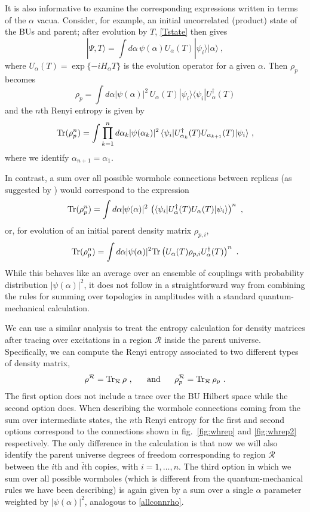\documentclass[12pt]{article}
\numberwithin{equation}{section}
\newcommand{\beq}{\begin{equation}}
\newcommand{\eeq}{\end{equation}}
\newcommand{\Tr}{{\rm Tr}}
\begin{document}
It is also informative to examine the corresponding expressions written in terms of the $\alpha$ vacua.  Consider, for example, an initial uncorrelated (product) state of the BUs and parent; after evolution by $T$, \eqref{Tstate} then gives
\beq\label{alphaevol}
|\Psi, T\rangle = \int d\alpha\, \psi(\alpha) U_\alpha(T) |\psi_i\rangle |\alpha\rangle\ ,
\eeq
where $U_\alpha(T) = \exp\{-i H_\alpha T\}$ is the evolution operator for a given $\alpha$.  Then $\rho_p$ becomes
\beq
\rho_p = \int d\alpha |\psi(\alpha)|^2\,  U_\alpha(T) |\psi_i\rangle \langle \psi_i| U_\alpha^\dagger(T)
\eeq
and the $n$th Renyi entropy is given by
\beq
\Tr(\rho_p^n) = \int \prod_{k=1}^n d\alpha_k |\psi(\alpha_k)|^2\, \langle \psi_i| U_{\alpha_k}^\dagger(T) U_{\alpha_{k+1}}(T) |\psi_i\rangle\ ,
\eeq
where we identify $\alpha_{n+1}=\alpha_1$.

In contrast, a sum over all possible wormhole connections between replicas (as suggested by \cite{Almheiri:2019qdq, Penington:2019kki}) would correspond to the expression
\beq\label{allconn}
\Tr(\rho_p^n) = \int d\alpha |\psi(\alpha)|^2\,  \left(\langle \psi_i| U_{\alpha}^\dagger(T) U_{\alpha}(T) |\psi_i\rangle\right)^n\ ,
\eeq
or, for evolution of an initial parent density matrix $\rho_{p,i}$, 
\beq\label{allconnrho}
\Tr(\rho_p^n) =  \int d\alpha |\psi(\alpha)|^2 \Tr\left(  U_{\alpha}(T)\rho_{p,i }U_{\alpha}^\dagger(T) \right)^n\ .
\eeq
While this behaves like an average over an ensemble of couplings with probability distribution $|\psi(\alpha)|^2$, it does not follow in a straightforward way from combining the rules for summing over topologies in amplitudes with a standard quantum-mechanical calculation.

We can use a similar analysis to treat the  entropy calculation for density matrices after tracing over excitations in a region $\mathcal{R}$ inside the parent universe. Specifically, we can compute the Renyi entropy associated to two different types of density matrix,
\begin{equation}
\rho^\mathcal{R} = {\rm Tr}_\mathcal{R}\, \rho\ ,~~~~~\text{and}~~~~~\rho_p^\mathcal{R} = {\rm Tr}_\mathcal{R}\, \rho_p\ .
\end{equation}
The first option does not include a trace over the BU Hilbert space while the second option does. 
When describing the wormhole connections coming from the sum over intermediate states, the $n$th Renyi entropy for the first and second options correspond to the connections shown in fig.~\ref{fig:whrep} and \ref{fig:whrep2} respectively. The only difference in the calculation is that now we will also identify the parent universe degrees of freedom corresponding to region $\mathcal{R}$ between the $i$th and $\bar{i}$th copies, with $i=1,\ldots, n$. The third option in which we sum over all possible wormholes (which is different from the quantum-mechanical rules we have been describing) is again  given by a sum over a single $\alpha$ parameter weighted by $|\psi(\alpha)|^2$, analogous to \eqref{allconnrho}.
\end{document}

